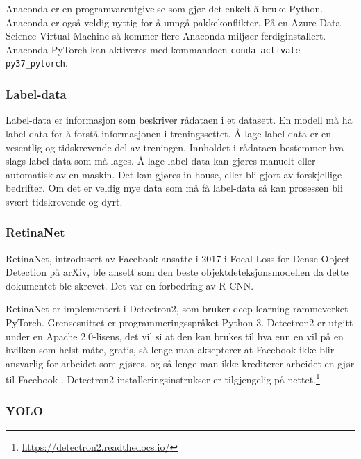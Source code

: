Anaconda er en programvareutgivelse som gjør det enkelt å bruke Python. Anaconda er også veldig nyttig for å unngå pakkekonflikter. På en Azure Data Science Virtual Machine så kommer flere Anaconda-miljøer ferdiginstallert. Anaconda PyTorch kan aktiveres med kommandoen \texttt{conda activate py37\_pytorch}. \cite{Mallick m.fl. 2020} %

\subsubsection{Label-data}

Label-data er informasjon som beskriver rådataen i et datasett. En modell må ha label-data for å forstå informasjonen i treningssettet. Å lage label-data er en vesentlig og tidskrevende del av treningen. Innholdet i rådataen bestemmer hva slags label-data som må lages. Å lage label-data kan gjøres manuelt eller automatisk av en maskin. Det kan gjøres in-house, eller bli gjort av forskjellige bedrifter. Om det er veldig mye data som må få label-data så kan prosessen bli svært tidskrevende og dyrt. \cite{Kaller 2019}


\subsubsection{RetinaNet}

RetinaNet, introdusert av Facebook-ansatte i 2017 i Focal Loss for Dense Object Detection på arXiv, ble ansett som den beste objektdeteksjonsmodellen da dette dokumentet ble skrevet. Det var en forbedring av R-CNN. \cite{Lin m.fl. 2017}

RetinaNet er implementert i Detectron2, som bruker deep learning-rammeverket PyTorch. Grensesnittet er programmeringsspråket Python 3. Detectron2 er utgitt under en Apache 2.0-lisens, det vil si at den kan brukes til hva enn en vil på en hvilken som helst måte, gratis, så lenge man aksepterer at Facebook ikke blir ansvarlig for arbeidet som gjøres, og så lenge man ikke krediterer arbeidet en gjør til Facebook \cite{The Apache Software Foundation 2004}. Detectron2 installeringsinstrukser er tilgjengelig på nettet.\footnote{\url{https://detectron2.readthedocs.io/}}

\subsubsection{YOLO}

